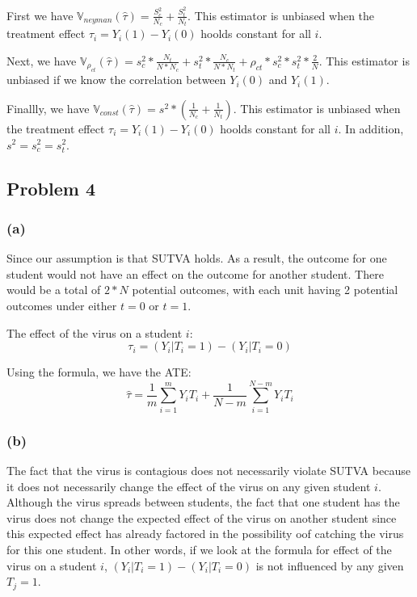 \documentclass[]{article}
\begin{document}
First we have
\(\mathbb{V}_{neyman}(\hat{\tau}) = \frac{S_c^2}{N_c} + \frac{S_t^2}{N_t}\).
This estimator is unbiased when the treatment effect
\(\tau_i = Y_i(1) - Y_i(0)\) hoolds constant for all \(i\).

Next, we have
\(\mathbb{V}_{\rho_{ct}} (\hat{\tau}) = s_c^2 * \frac{N_t}{N * N_c} + s_t^2 * \frac{N_c}{N * N_t} + \rho_{ct} * s_c^2 * s_t^2 * \frac{2}{N}\).
This estimator is unbiased if we know the correlation between \(Y_i(0)\)
and \(Y_i(1)\).

Finallly, we have
\(\mathbb{V}_{const}(\hat{\tau}) = s^2 * (\frac{1}{N_c} + \frac{1}{N_t})\).
This estimator is unbiased when the treatment effect
\(\tau_i = Y_i(1) - Y_i(0)\) hoolds constant for all \(i\). In addition,
\(s^2 = s_c^2 = s_t^2\).

\hypertarget{problem-4}{%
\subsection{Problem 4}\label{problem-4}}

\hypertarget{a-2}{%
\subsubsection{(a)}\label{a-2}}

Since our assumption is that SUTVA holds. As a result, the outcome for
one student would not have an effect on the outcome for another student.
There would be a total of \(2*N\) potential outcomes, with each unit
having 2 potential outcomes under either \(t=0\) or \(t=1\).

The effect of the virus on a student \(i\):
\[\tau_i = (Y_i|T_i = 1) - (Y_i|T_i = 0)\]

Using the formula, we have the ATE:
\[\hat{\tau} = \frac{1}{m} \sum_{i=1}^{m} Y_i T_i + \frac{1}{N-m} \sum_{i=1}^{N-m} Y_i T_i\]

\hypertarget{b-1}{%
\subsubsection{(b)}\label{b-1}}

The fact that the virus is contagious does not necessarily violate SUTVA
because it does not necessarily change the effect of the virus on any
given student \(i\). Although the virus spreads between students, the
fact that one student has the virus does not change the expected effect
of the virus on another student since this expected effect has already
factored in the possibility oof catching the virus for this one student.
In other words, if we look at the formula for effect of the virus on a
student \(i\), \((Y_i|T_i = 1) - (Y_i|T_i = 0)\) is not influenced by
any given \(T_j = 1\).
\end{document}
